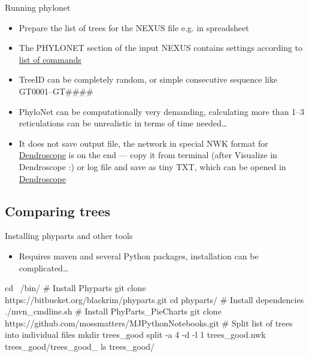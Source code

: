\documentclass[compress, ucs, xelatex, 11pt, xcolor=x11names, aspectratio=169,
	hyperref={
		bookmarks=true,
		unicode=true,
		colorlinks=true,
		pdftitle={HybSeq course},
		plainpages=false,
		pdfauthor={Vojtech Zeisek},
		pdfsubject={Practical processing of HybSeq target enrichment sequencing data on computing grids like MetaCentrum},
		pdfcreator={XeLaTeX},
		pdfkeywords={BASH, command line, GNU, HybSeq, Linux, MetaCentrum, sequencing shell, target enrichment},
		linkcolor=Cyan2, %
		anchorcolor=Firebrick2, %
		citecolor=Firebrick2, %
		filecolor=Firebrick2, %
		menucolor=Firebrick2, %
		urlcolor=Chartreuse2, %
		pdftex},
	url={hyphens, lowtilde} %
	]{beamer}
\renewcommand{\texttt}[1]{\colorbox{Snow4}{{\ttfamily #1}}}
\begin{document}
\begin{frame}{Running phylonet}
	\begin{itemize}
		\item Prepare the list of trees for the NEXUS file e.g. in spreadsheet
		\item The \texttt{PHYLONET} section of the input NEXUS contains settings according to \href{https://wiki.rice.edu/confluence/display/PHYLONET/List+of+PhyloNet+Commands}{list of commands}
		\item TreeID can be completely random, or simple consecutive sequence like GT0001--GT\#\#\#\#
		\item PhyloNet can be computationally very demanding, calculating more than 1--3 reticulations can be unrealistic in terms of time needed\ldots
		\item It does not save output file, the network in special NWK format for \href{https://www.wsi.uni-tuebingen.de/lehrstuehle/algorithms-in-bioinformatics/software/dendroscope/}{Dendroscope} is on the end --- copy it from terminal (after \texttt{Visualize in Dendroscope :}) or log file and save as tiny TXT, which can be opened in \href{https://www.wsi.uni-tuebingen.de/lehrstuehle/algorithms-in-bioinformatics/software/dendroscope/}{Dendroscope}
	\end{itemize}
\end{frame}

\subsection{Comparing trees}

\begin{frame}[fragile]{Installing phyparts and other tools}
	\begin{itemize}
		\item Requires \texttt{maven} and several Python packages, installation can be complicated\ldots
	\end{itemize}
	\begin{bashcode}
    cd ~/bin/
    # Install Phyparts
    git clone https://bitbucket.org/blackrim/phyparts.git
    cd phyparts/
    # Install dependencies
    ./mvn_cmdline.sh
    # Install PhyParts_PieCharts
    git clone https://github.com/mossmatters/MJPythonNotebooks.git
    # Split list of trees into individual files
    mkdir trees_good
    split -a 4 -d -l 1 trees_good.nwk trees_good/trees_good_
    ls trees_good/
	\end{bashcode}
\end{frame}
\end{document}
